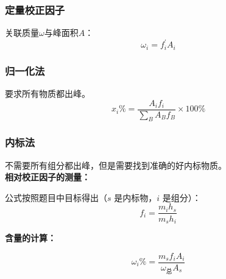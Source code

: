 \documentclass[UTF8,AutoFakeBold,b5paper]{ctexbook}
\begin{document}
\subsubsection{定量校正因子}
关联质量$\omega$与峰面积$A$：
\begin{equation}
	\omega_{i} = f_{i}^{'}A_{i}
	\end{equation}
	
\subsubsection{归一化法}
\textcolor[rgb]{0.54,0.13,0.33}{要求所有物质都出峰。}
\begin{equation}
	x_{i}\% = \dfrac{A_{i}f_{i}}{\displaystyle\sum_{B}A_{B}f_{B}}\times 100\%
\end{equation}
\subsubsection{内标法}
\textcolor[rgb]{0.54,0.13,0.33}{不需要所有组分都出峰，但是需要找到准确的好内标物质。}\\


\textbf{相对校正因子的测量：}

公式按照题目中目标得出（$s$ 是内标物，$i$ 是组分）：
\begin{equation}
	f_{i} = \dfrac{m_{i}h_{s}}{m_{s}h_{i}} 
\end{equation}

\textbf{含量的计算：}

\begin{equation}
	\omega_{i}\% = \dfrac{{m_{s}f_{i}A_{i}}}{\omega_{\text{总}}A_{s}} 
\end{equation}

\printindex
\end{document}
